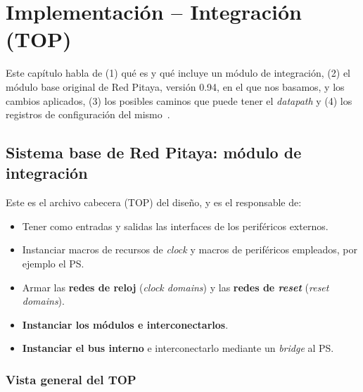 \chapter{Implementación -- Integración (TOP)}
\label{C:top}

\graphicspath{{figs/cap12/}{figs/comunes/}}

\begin{destacado}
Este capítulo habla de (1) qué es y qué incluye un módulo de integración, (2) el
módulo base original de Red Pitaya, versión 0.94, en el que nos basamos, y los
cambios aplicados, (3) los posibles caminos que puede tener el \emph{datapath} y (4)
los registros de configuración del mismo~\cite{RedPitayaFPGA}.
\end{destacado}

\section{Sistema base de Red Pitaya: módulo de integración}
\label{S:top-sistema-base}

Este es el archivo cabecera (TOP) del diseño, y es el responsable de:
\begin{itemize}
  \item Tener como entradas y salidas las interfaces de los periféricos
    externos.
  \item Instanciar macros de recursos de \emph{clock} y macros de periféricos
    empleados, por ejemplo el PS.
  \item Armar las \textbf{redes de reloj} (\emph{clock domains}) y las
    \textbf{redes de \emph{reset}} (\emph{reset domains}).
  \item \textbf{Instanciar los módulos e interconectarlos}.
  \item \textbf{Instanciar el bus interno} e interconectarlo mediante un \emph{bridge}
    al PS.
\end{itemize}

\subsection{Vista general del TOP}
\label{S:top-vista-general}

